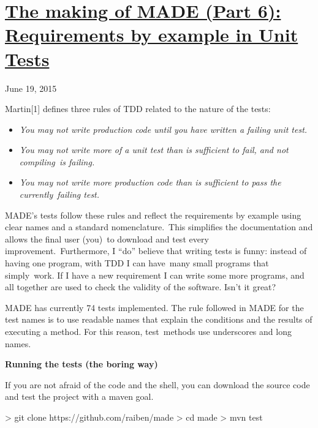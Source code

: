 \documentclass[a4paper]{article}
\newcommand\textstyleStrongEmphasis[1]{\textbf{#1}}
\newcommand\textstyleEmphasis[1]{\textit{#1}}
\newcommand\liststyleLxi{%
\renewcommand\labelitemi{{\textbullet}}
\renewcommand\labelitemii{{\textbullet}}
\renewcommand\labelitemiii{{\textbullet}}
\renewcommand\labelitemiv{{\textbullet}}
}
\begin{document}
\bigskip

\clearpage\section[The making of MADE (Part 6): Requirements by example
in Unit
Tests]{\href{http://www.velonuboso.com/made/2015/06/19/making-part-6-requirements-expressed-junit-tests/}{The
making of MADE (Part 6): Requirements by example in Unit Tests}}
June 19, 2015

Martin[1] defines three rules of TDD related to the nature of the tests:

\liststyleLxi
\begin{itemize}
\item \textstyleEmphasis{You may not write production code until you
have written a failing unit test.} 
\item \textstyleEmphasis{You may not write more of a unit test than is
sufficient to fail, and not compiling~is failing.} 
\item \textstyleEmphasis{You may not write more production code than is
sufficient to pass the currently~failing test.} 
\end{itemize}
MADE{\textquoteright}s tests follow these rules and reflect the
requirements by example using clear names and a standard
nomenclature.~This simplifies the documentation and allows the final
user (you)~to download and test every improvement.~Furthermore, I
{\textquotedblleft}do{\textquotedblright} believe that writing tests is
funny: instead of having one program, with TDD I can have~many small
programs that simply~work. If I have a new requirement I can write some
more programs, and all together are used to check the validity of the
software. Isn{\textquoteright}t it great?

MADE has currently 74 tests implemented. The rule followed in MADE for
the test names is to use readable names that explain the conditions and
the results of executing a method. For this reason, test~methods use
underscores and long names.

\textstyleStrongEmphasis{Running the tests (the boring way)}

If you are not afraid of the code and the shell, you can download the
source code and test the project with a maven goal.

{\textgreater} git clone https://github.com/raiben/made\newline
{\textgreater} cd made\newline
{\textgreater} mvn test
\end{document}
